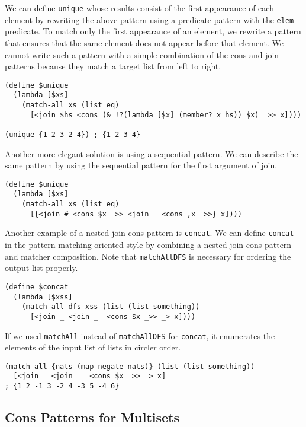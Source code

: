 \documentclass{article}
\begin{document}
We can define \texttt{unique} whose results consist of the first appearance of each element by rewriting the above pattern using a predicate pattern with the \texttt{elem} predicate.
To match only the first appearance of an element, we rewrite a pattern that ensures that the same element does not appear before that element.
We cannot write such a pattern with a simple combination of the cons and join patterns because they match a target list from left to right.

\begin{lstlisting}[language=egison]
(define $unique
  (lambda [$xs]
    (match-all xs (list eq)
      [<join $hs <cons (& !?(lambda [$x] (member? x hs)) $x) _>> x])))

(unique {1 2 3 2 4}) ; {1 2 3 4}
\end{lstlisting}

Another more elegant solution is using a sequential pattern.
We can describe the same pattern by using the sequential pattern for the first argument of join.

\begin{lstlisting}[language=egison]
(define $unique
  (lambda [$xs]
    (match-all xs (list eq)
      [{<join # <cons $x _>> <join _ <cons ,x _>>} x])))
\end{lstlisting}

\medskip

Another example of a nested join-cons pattern is \texttt{concat}.
We can define \texttt{concat} in the pattern-matching-oriented style by combining a nested join-cons pattern and matcher composition.
Note that \texttt{matchAllDFS} is necessary for ordering the output list properly.

\begin{lstlisting}[language=egison]
(define $concat
  (lambda [$xss]
    (match-all-dfs xss (list (list something))
      [<join _ <join _  <cons $x _>> _> x])))
\end{lstlisting}

\noindent If we used \texttt{matchAll} instead of \texttt{matchAllDFS} for \texttt{concat}, it enumerates the elements of the input list of lists in circler order.

\begin{lstlisting}[language=egison]
(match-all {nats (map negate nats)} (list (list something))
  [<join _ <join _  <cons $x _>> _> x]
; {1 2 -1 3 -2 4 -3 5 -4 6}
\end{lstlisting}

\subsection{Cons Patterns for Multisets}\label{cons-pat}
\end{document}
